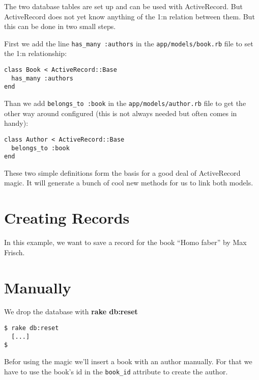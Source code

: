 \documentclass[a4paper]{book}
\newcounter{tab}[chapter]
\begin{document}
The two database tables are set up and can be used with ActiveRecord. But ActiveRecord does not yet know anything of the 1:n relation between them. But this can be done in two small steps.

First we add the line \texttt{has\_many :authors} in the \texttt{app/models/book.rb} file to set the 1:n relationship:

\begin{shaded}\begin{verbatim}
class Book < ActiveRecord::Base
  has_many :authors
end
\end{verbatim}\end{shaded}

Than we add \texttt{belongs\_to :book} in the \texttt{app/models/author.rb} file to get the other way around configured (this is not always needed but often comes in handy):

\begin{shaded}\begin{verbatim}
class Author < ActiveRecord::Base
  belongs_to :book
end
\end{verbatim}\end{shaded}

These two simple definitions form the basis for a good deal of ActiveRecord magic. It will generate a bunch of cool new methods for us to link both models.

\section{Creating Records}\label{creating-records}

In this example, we want to save a record for the book “Homo faber” by Max Frisch.

\section{Manually}\label{manually}

We drop the database with \textbf{rake db:reset}

\begin{shaded}\begin{verbatim}
$ rake db:reset
  [...]
$  
\end{verbatim}\end{shaded}

Befor using the magic we'll insert a book with an author manually. For that we have to use the book's id in the \texttt{book\_id} attribute to create the author.
\end{document}
